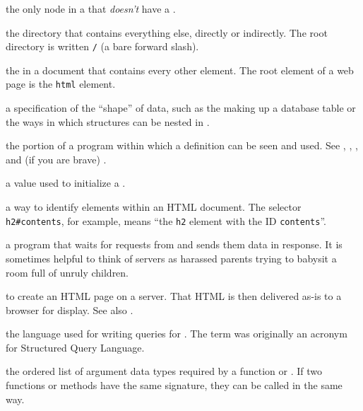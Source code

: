 \begin{description}
the only node in a  that \emph{doesn't} have a .

the directory that contains everything else, directly or indirectly. The root
directory is written \texttt{/} (a bare forward slash).

the  in a document that contains every other element.
The root element of a web page is the \texttt{html} element.

a specification of the ``shape'' of data, such as the  making
up a database table or the ways in which structures can be nested in
.

the portion of a program within which a definition can be seen and used. See
, ,
, and (if you are brave)
.

a value used to initialize a .

a way to identify elements within an HTML document. The selector
\texttt{h2\#contents}, for example, means ``the \texttt{h2} element with the ID \texttt{contents}''.

a program that waits for requests from  and sends them
data in response. It is sometimes helpful to think of servers as harassed
parents trying to babysit a room full of unruly children.

to create an HTML page on a server. That HTML is then delivered as-is to a
browser for display. See also .

the language used for writing queries for . The term was originally an acronym for
Structured Query Language.

the ordered list of argument data types required by a function or
. If two functions or methods have the same signature,
they can be called in the same way.


\end{description}

